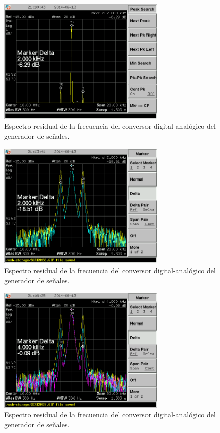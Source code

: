 \documentclass[a4paper,10pt]{article}
\begin{document}
		\begin{figure}[!htb]
				\centering
				\includegraphics[width=8cm]
				{Imagenes/SCREN456.png}
				\caption{Espectro residual de la frecuencia del conversor 
				digital-anal\'ogico del generador de se\~nales.}
				\label{AM1} 
		\end{figure}

		\begin{figure}[!htb]
				\centering
				\includegraphics[width=8cm]
				{Imagenes/SCREN457.png}
				\caption{Espectro residual de la frecuencia del conversor 
				digital-anal\'ogico del generador de se\~nales.}
				\label{AM2} 
		\end{figure}
		\begin{figure}[!htb]
				\centering
				\includegraphics[width=8cm]
				{Imagenes/SCREN458.png}
				\caption{Espectro residual de la frecuencia del conversor 
				digital-anal\'ogico del generador de se\~nales.}
				\label{AM3} 
		\end{figure}
		
\end{document}
